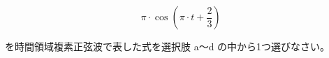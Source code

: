 \[
\pi \cdot \cos \left ( \pi \cdot t + \frac{2}{3} \right )
\]

\bigskip
\noindent を時間領域複素正弦波で表した式を選択肢 a〜d の中から1つ選びなさい。

